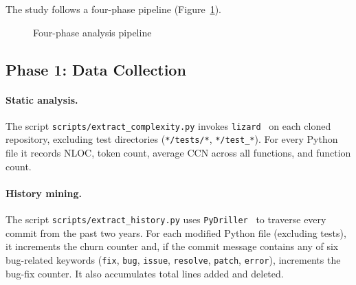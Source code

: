 \documentclass[12pt,a4paper]{article}
\begin{document}
The study follows a four-phase pipeline (Figure~\ref{fig:pipeline}).

\begin{figure}[!htb]
\centering
{}
\caption{Four-phase analysis pipeline}
\label{fig:pipeline}
\end{figure}

\subsection{Phase 1: Data Collection}

\paragraph{Static analysis.}
The script \texttt{scripts/extract\_complexity.py} invokes \texttt{lizard}~\cite{yin2023} on each cloned repository, excluding test directories (\texttt{*/tests/*}, \texttt{*/test\_*}). For every Python file it records NLOC, token count, average CCN across all functions, and function count.

\paragraph{History mining.}
The script \texttt{scripts/extract\_history.py} uses \texttt{PyDriller}~\cite{spadini2018} to traverse every commit from the past two years.
For each modified Python file (excluding tests), it increments the churn counter and, if the commit message contains any of six bug-related keywords (\texttt{fix}, \texttt{bug}, \texttt{issue}, \texttt{resolve}, \texttt{patch}, \texttt{error}), increments the bug-fix counter.
It also accumulates total lines added and deleted.
\end{document}

